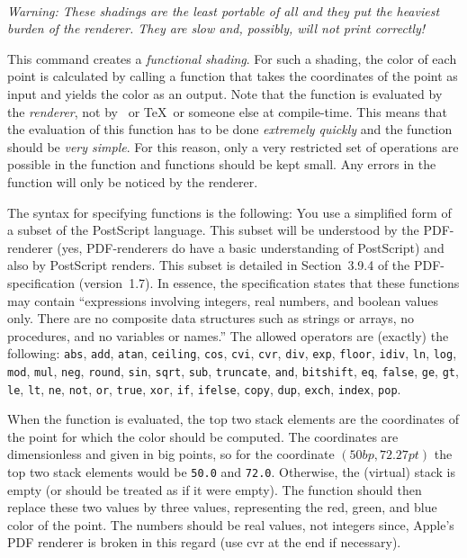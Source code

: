 \begin{command}{\pgfdeclarefunctionalshading{}\\
}
    \emph{Warning: These shadings are the least portable of all and they put
    the heaviest burden of the renderer. They are slow and, possibly, will not
    print correctly!}

    This command creates a \emph{functional shading}. For such a shading, the
    color of each point is calculated by calling a function that takes the
    coordinates of the point as input and yields the color as an output. Note
    that the function is evaluated by the \emph{renderer}, not by \pgfname\ or
    \TeX\ or someone else at compile-time. This means that the evaluation of
    this function has to be done \emph{extremely quickly} and the function
    should be \emph{very simple}. For this reason, only a very restricted set
    of operations are possible in the function and functions should be kept
    small. Any errors in the function will only be noticed by the renderer.

    The syntax for specifying functions is the following: You use a simplified
    form of a subset of the PostScript language. This subset will be understood
    by the PDF-renderer (yes, PDF-renderers do have a basic understanding of
    PostScript) and also by PostScript renders. This subset is detailed in
    Section~3.9.4 of the PDF-specification (version~1.7). In essence, the
    specification states that these functions may contain ``expressions
    involving integers, real numbers, and boolean values only. There are no
    composite data structures such as strings or arrays, no procedures, and no
    variables or names.'' The allowed operators are (exactly) the following:
    \texttt{abs}, \texttt{add}, \texttt{atan}, \texttt{ceiling}, \texttt{cos},
    \texttt{cvi}, \texttt{cvr}, \texttt{div}, \texttt{exp}, \texttt{floor},
    \texttt{idiv}, \texttt{ln}, \texttt{log}, \texttt{mod}, \texttt{mul},
    \texttt{neg}, \texttt{round}, \texttt{sin}, \texttt{sqrt}, \texttt{sub},
    \texttt{truncate}, \texttt{and}, \texttt{bitshift}, \texttt{eq},
    \texttt{false}, \texttt{ge}, \texttt{gt}, \texttt{le}, \texttt{lt},
    \texttt{ne}, \texttt{not}, \texttt{or}, \texttt{true}, \texttt{xor},
    \texttt{if}, \texttt{ifelse}, \texttt{copy}, \texttt{dup}, \texttt{exch},
    \texttt{index}, \texttt{pop}.

    When the function is evaluated, the top two stack elements are the
    coordinates of the point for which the color should be computed. The
    coordinates are dimensionless and given in big points, so for the
    coordinate $(50bp, 72.27pt)$ the top two stack elements would be
    \texttt{50.0} and \texttt{72.0}. Otherwise, the (virtual) stack is empty
    (or should be treated as if it were empty). The function should then
    replace these two values by three values, representing the red, green, and
    blue color of the point. The numbers should be real values, not integers
    since, Apple's PDF renderer is broken in this regard (use cvr at the end if
    necessary).


\end{command}
